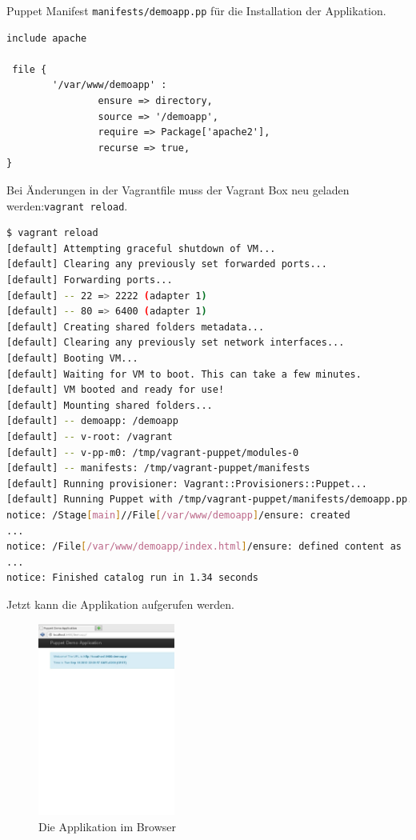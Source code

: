 \documentclass[12pt,a4paper,ngerman]{article}
\begin{document}
Puppet Manifest \lstinline$manifests/demoapp.pp$ für die Installation der Applikation.
\begin{lstlisting}[language=puppet,caption=Puppet Manifest für die Applikation, label=puppetdemoapp]
include apache

 file {
        '/var/www/demoapp' :
                ensure => directory,
                source => '/demoapp',
                require => Package['apache2'],
                recurse => true,
}
\end{lstlisting}

Bei Änderungen in der Vagrantfile muss der Vagrant Box neu geladen werden:\lstinline$vagrant reload$.
\begin{lstlisting}[language=sh,caption=Puppet reload mit Provisioning der Applikation, label=reloaddemoapp]
$ vagrant reload
[default] Attempting graceful shutdown of VM...
[default] Clearing any previously set forwarded ports...
[default] Forwarding ports...
[default] -- 22 => 2222 (adapter 1)
[default] -- 80 => 6400 (adapter 1)
[default] Creating shared folders metadata...
[default] Clearing any previously set network interfaces...
[default] Booting VM...
[default] Waiting for VM to boot. This can take a few minutes.
[default] VM booted and ready for use!
[default] Mounting shared folders...
[default] -- demoapp: /demoapp
[default] -- v-root: /vagrant
[default] -- v-pp-m0: /tmp/vagrant-puppet/modules-0
[default] -- manifests: /tmp/vagrant-puppet/manifests
[default] Running provisioner: Vagrant::Provisioners::Puppet...
[default] Running Puppet with /tmp/vagrant-puppet/manifests/demoapp.pp...
notice: /Stage[main]//File[/var/www/demoapp]/ensure: created
...
notice: /File[/var/www/demoapp/index.html]/ensure: defined content as '{md5}90a8d419b9c7b43b09ba73abebaf8f4c'
...
notice: Finished catalog run in 1.34 seconds
\end{lstlisting}

Jetzt kann die Applikation aufgerufen werden.
\begin{figure}
  \begin{center}
    \includegraphics[width=0.4\textwidth]{images/demoapp.pdf}
  \end{center}
  \caption{Die Applikation im Browser}
  \label{demoapp}
\end{figure}
\end{document}
